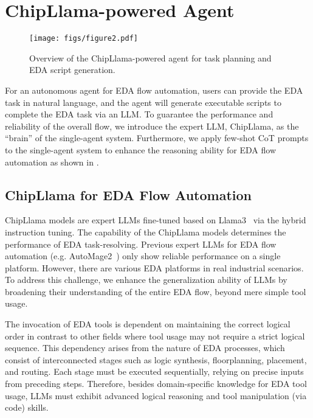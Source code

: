 \section{ChipLlama-powered Agent}

\begin{figure}[tb!]
    \centering
    \texttt{[image: figs/figure2.pdf]} 
    \caption{Overview of the ChipLlama-powered agent for task planning and EDA script generation. 
    } 
    \label{fig:ChipAgent}
\end{figure}

For an autonomous agent for EDA flow automation, users can provide the EDA task in natural language, and the agent will generate executable scripts to complete the EDA task via an LLM.
To guarantee the performance and reliability of the overall flow, we introduce the expert LLM, ChipLlama, as the ``brain'' of the single-agent system.  
Furthermore, we apply few-shot CoT prompts to the single-agent system to enhance the reasoning ability for EDA flow automation as shown in .

\subsection{ChipLlama for EDA Flow Automation}

ChipLlama models are expert LLMs fine-tuned based on Llama3~\cite{dubey2024llama3} via the hybrid instruction tuning.
The capability of the ChipLlama models determines the performance of EDA task-resolving.
Previous expert LLMs for EDA flow automation (e.g. AutoMage2~\cite{wu2024chateda}) only show reliable performance on a single platform.
However, there are various EDA platforms in real industrial scenarios.
To address this challenge, we enhance the generalization ability of LLMs by broadening their understanding of the entire EDA flow, beyond mere simple tool usage.

The invocation of EDA tools is dependent on maintaining the correct logical order in contrast to other fields where tool usage may not require a strict logical sequence. 
This dependency arises from the nature of EDA processes, which consist of interconnected stages such as logic synthesis, floorplanning, placement, and routing. 
Each stage must be executed sequentially, relying on precise inputs from preceding steps.
Therefore, besides domain-specific knowledge for EDA tool usage, LLMs must exhibit advanced logical reasoning and tool manipulation (via code) skills.

